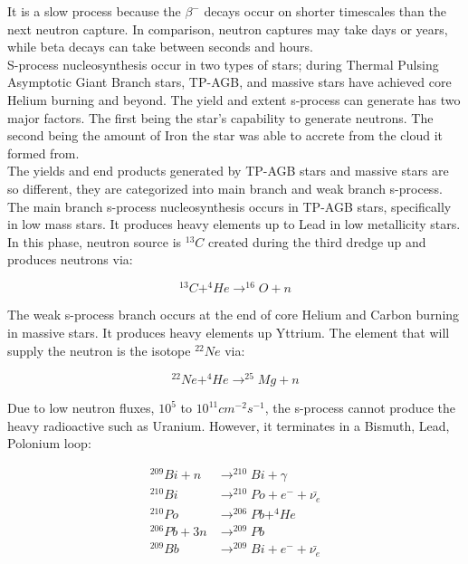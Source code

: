 \documentclass{article}
\begin{document}
\noindent It is a slow process because the $\beta^{-}$ decays occur on shorter timescales than the next neutron capture. In comparison, 
neutron captures may take days or years, while beta decays can take between seconds and hours.\\

\noindent S-process nucleosynthesis occur in two types of stars; during Thermal Pulsing Asymptotic Giant Branch stars, TP-AGB, and massive stars 
have achieved core Helium burning and beyond. The yield and extent s-process can generate has two major factors. The first being the 
star's capability to generate neutrons. The second being the amount of Iron the star was able to accrete from the cloud it formed from.\\

\noindent The yields and end products generated by TP-AGB stars and massive stars are so different, they are categorized into main branch and weak 
branch s-process. The main branch s-process nucleosynthesis occurs in TP-AGB stars, specifically in low mass stars. It produces heavy 
elements up to Lead in low metallicity stars. In this phase, neutron source is $^{13}C$ created during the third dredge up \cite{kww} and 
produces neutrons via:

\begin{equation*}
^{13}C + ^{4}He \rightarrow ^{16}O + n 
\end{equation*}

\noindent The weak s-process branch occurs at the end of core Helium and Carbon burning in massive stars. It produces heavy elements up Yttrium.
The element that will supply the neutron is the isotope $^{22}Ne$ via:

\begin{equation*}
    ^{22}Ne + ^{4}He \rightarrow ^{25}Mg + n
\end{equation*}

\noindent Due to low neutron fluxes, $10^{5}$ to $10^{11} cm^{-2}s^{-1}$, the s-process cannot produce the heavy radioactive such as Uranium. 
However, it terminates in a Bismuth, Lead, Polonium loop:

\begin{align*}
    ^{209}Bi + n &\rightarrow ^{210}Bi + \gamma\\
    ^{210}Bi &\rightarrow ^{210}Po + e^{-} + \bar{\nu_{e}}\\
    ^{210}Po &\rightarrow ^{206}Pb + ^{4}He\\
    ^{206}Pb + 3n &\rightarrow ^{209}Pb\\
    ^{209}Bb &\rightarrow ^{209}Bi + e^{-} + \bar{\nu_{e}}
\end{align*}
\end{document}
